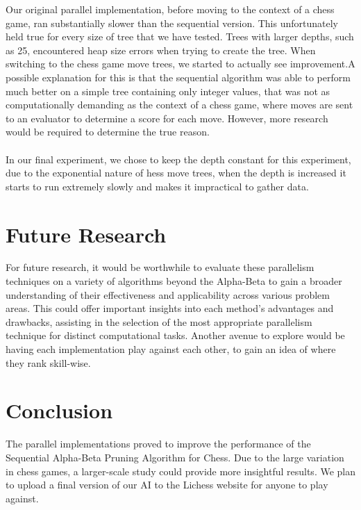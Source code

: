 \documentclass[conference, 11pt]{IEEEtran}
\begin{document}
Our original parallel implementation, before moving to the context of a chess game, ran substantially slower than the sequential version. This unfortunately held true for every size of tree that we have tested. Trees with larger depths, such as 25, encountered heap size errors when trying to create the tree. When switching to the chess game move trees, we started to actually see improvement.A possible explanation for this is that the sequential algorithm was able to perform much better on a simple tree containing only integer values, that was not as computationally demanding as the context of a chess game, where moves are sent to an evaluator to determine a score for each move. However, more research would be required to determine the true reason. \\
 \\ In our final experiment, we chose to keep the depth constant for this experiment, due to the exponential nature of  hess move trees, when the depth is increased it starts to run extremely slowly and makes it impractical to gather data.


\section{Future Research}
\vspace{10pt}

For future research, it would be worthwhile to evaluate these parallelism techniques on a variety of algorithms beyond the Alpha-Beta to gain a broader understanding of their effectiveness and applicability across various problem areas. This could offer important insights into each method's advantages and drawbacks, assisting in the selection of the most appropriate parallelism technique for distinct computational tasks. Another avenue to explore would be having each implementation play against each other, to gain an idea of where they rank skill-wise.

\section{Conclusion}
\vspace{10pt}

The parallel implementations proved to improve the performance of the Sequential Alpha-Beta Pruning Algorithm for Chess. Due to the large variation in chess games, a larger-scale study could provide more insightful results. We plan to upload a final version of our AI to the Lichess website for anyone to play against.
\end{document}
